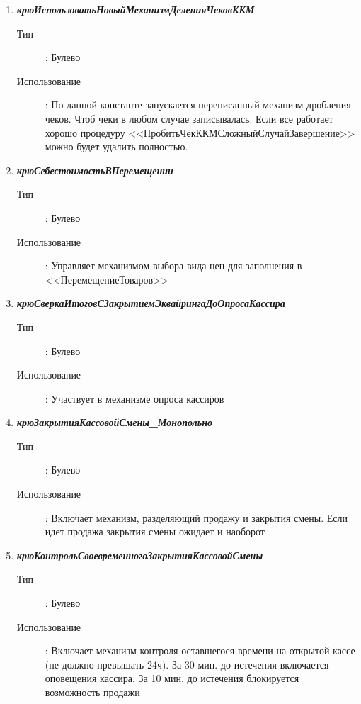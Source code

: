 \begin{enumerate}[label=(\arabic*)]
\vspace{\baselineskip}
\item \textbf{\textit{крюИспользоватьНовыйМеханизмДеленияЧековККМ}}
\begin{description}
    \item[Тип] : Булево
    \item[Использование]:  По данной константе запускается переписанный механизм дробления чеков. Чтоб чеки в любом случае записывалась. Если все работает хорошо процедуру <<ПробитьЧекККМСложныйСлучайЗавершение>> можно будет удалить полностью.
\end{description}

\vspace{\baselineskip}
\item \textbf{\textit{крюСебестоимостьВПеремещении}}
\begin{description}
    \item[Тип] : Булево
    \item[Использование]: Управляет механизмом выбора вида цен для заполнения в <<ПеремещениеТоваров>>
\end{description}

\vspace{\baselineskip}
\item \textbf{\textit{крюСверкаИтоговСЗакрытиемЭквайрингаДоОпросаКассира}}
\begin{description}
    \item[Тип] : Булево
    \item[Использование]: Участвует в механизме опроса кассиров
\end{description}


\vspace{\baselineskip}
\item \textbf{\textit{крюЗакрытияКассовойСмены\_Монопольно}}
\begin{description}
    \item[Тип] : Булево
    \item[Использование]: Включает механизм, разделяющий продажу и закрытия смены.
    Если идет продажа закрытия смены ожидает и наоборот
\end{description}

\vspace{\baselineskip}
\item \textbf{\textit{крюКонтрольСвоевременногоЗакрытияКассовойСмены}}
\begin{description}
    \item[Тип] : Булево
    \item[Использование]: Включает механизм контроля оставшегося времени на открытой кассе (не должно превышать 24ч). За 30 мин. до истечения включается оповещения кассира. За 10 мин. до истечения блокируется возможность продажи
\end{description}


\end{enumerate}
